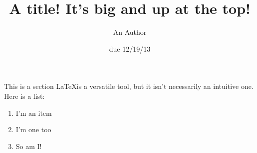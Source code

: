 \documentclass[a4paper,10pt,notitlepage]{article}
\title{A title! It's big and up at the top!}
\author{An Author}
\date{due 12/19/13}
\begin{document}
\lstset{language=Mathematica}

\maketitle


\begin{section}{This is a section}
\LaTeX is a versatile tool, but it isn't necessarily an intuitive one. Here is a list:

\begin{enumerate}
\item I'm an item
\item I'm one too
\item So am I!
\end{enumerate}

\end{section}
\end{document}

